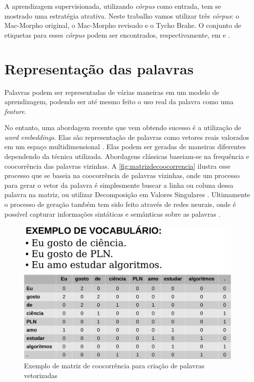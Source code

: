 A aprendizagem supervisionada, utilizando \textit{córpus} como entrada, tem se mostrado uma estratégia atrativa. Neste trabalho vamos utilizar três \textit{córpus}: o Mac-Morpho original, o Mac-Morpho revisado e o Tycho Brahe. O conjunto de etiquetas para esses \textit{córpus} podem ser encontrados, respectivamente, em \cite{fonseca2015evaluating} e \cite{tychobrahe2010corpus}.



\section{Representação das palavras}\label{sec:representacaodaspalavras}

Palavras podem ser representadas de várias maneiras em um modelo de aprendizagem, podendo ser até mesmo feito o uso real da palavra como uma \textit{feature}.

No entanto, uma abordagem recente que vem obtendo sucesso é a utilização de \textit{word embeddings}. Elas são representação de palavras como vetores reais valorados em um espaço multidimensional \cite{turian2010word}. Elas podem ser geradas de maneiras diferentes dependendo da técnica utilizada. Abordagens clássicas baseiam-se na frequência e coocorrência das palavras vizinhas. A \autoref{fig:matrizdecoocorrencia} ilustra esse processo que se baseia na coocorrência de palavras vizinhas, onde um processo para gerar o vetor da palavra é simplesmente buscar a linha ou coluna dessa palavra na matriz, ou utilizar Decomposição em Valores Singulares \cite{deeplearningfornlp}. Ultimamente o processo de geração também tem sido feito através de redes neurais, onde é possível capturar informações sintáticas e semânticas sobre as palavras \cite{collobert2011natural}.

\begin{figure}[!htb]
  \caption{Exemplo de matriz de coocorrência para criação de palavras vetorizadas} \label{fig:matrizdecoocorrencia}
  \begin{center}
      \includegraphics[scale=0.4]{img/matrizdecoocorrencia.pdf}
  \end{center}
\end{figure}

